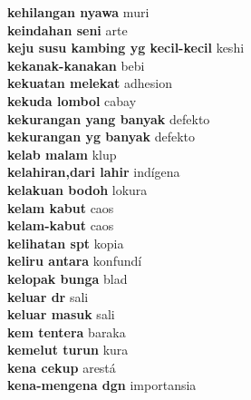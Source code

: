 \textbf{ kehilangan nyawa  } muri \\
\textbf{ keindahan seni  } arte \\
\textbf{ keju susu kambing yg kecil-kecil  } keshi \\
\textbf{ kekanak-kanakan  } bebi \\
\textbf{ kekuatan melekat  } adhesion \\
\textbf{ kekuda lombol  } cabay \\
\textbf{ kekurangan yang banyak  } defekto \\
\textbf{ kekurangan yg banyak  } defekto \\
\textbf{ kelab malam  } klup \\
\textbf{ kelahiran,dari lahir  } indígena \\
\textbf{ kelakuan bodoh  } lokura \\
\textbf{ kelam kabut  } caos \\
\textbf{ kelam-kabut  } caos \\
\textbf{ kelihatan spt  } kopia \\
\textbf{ keliru antara  } konfundí \\
\textbf{ kelopak bunga  } blad \\
\textbf{ keluar dr  } sali \\
\textbf{ keluar masuk  } sali \\
\textbf{ kem tentera  } baraka \\
\textbf{ kemelut turun  } kura \\
\textbf{ kena cekup  } arestá \\
\textbf{ kena-mengena dgn  } importansia \\
